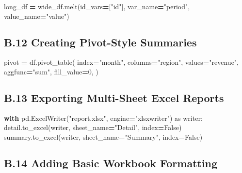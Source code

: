 \documentclass[
  12pt,
]{article}
\newenvironment{Shaded}{\begin{snugshade}}{\end{snugshade}}
\newcommand{\ControlFlowTok}[1]{\textcolor[rgb]{0.13,0.29,0.53}{\textbf{#1}}}
\newcommand{\DecValTok}[1]{\textcolor[rgb]{0.00,0.00,0.81}{#1}}
\newcommand{\ImportTok}[1]{#1}
\newcommand{\NormalTok}[1]{#1}
\newcommand{\OperatorTok}[1]{\textcolor[rgb]{0.81,0.36,0.00}{\textbf{#1}}}
\newcommand{\StringTok}[1]{\textcolor[rgb]{0.31,0.60,0.02}{#1}}
\newcommand{\VariableTok}[1]{\textcolor[rgb]{0.00,0.00,0.00}{#1}}
\begin{document}
\begin{Shaded}
\begin{Highlighting}[]
\NormalTok{long\_df }\OperatorTok{=}\NormalTok{ wide\_df.melt(id\_vars}\OperatorTok{=}\NormalTok{[}\StringTok{"id"}\NormalTok{], var\_name}\OperatorTok{=}\StringTok{"period"}\NormalTok{, value\_name}\OperatorTok{=}\StringTok{"value"}\NormalTok{)}
\end{Highlighting}
\end{Shaded}

\subsection{B.12 Creating Pivot-Style
Summaries}\label{b.12-creating-pivot-style-summaries}

\begin{Shaded}
\begin{Highlighting}[]
\NormalTok{pivot }\OperatorTok{=}\NormalTok{ df.pivot\_table(}
\NormalTok{    index}\OperatorTok{=}\StringTok{"month"}\NormalTok{,}
\NormalTok{    columns}\OperatorTok{=}\StringTok{"region"}\NormalTok{,}
\NormalTok{    values}\OperatorTok{=}\StringTok{"revenue"}\NormalTok{,}
\NormalTok{    aggfunc}\OperatorTok{=}\StringTok{"sum"}\NormalTok{,}
\NormalTok{    fill\_value}\OperatorTok{=}\DecValTok{0}\NormalTok{,}
\NormalTok{)}
\end{Highlighting}
\end{Shaded}

\subsection{B.13 Exporting Multi-Sheet Excel
Reports}\label{b.13-exporting-multi-sheet-excel-reports}

\begin{Shaded}
\begin{Highlighting}[]
\ControlFlowTok{with}\NormalTok{ pd.ExcelWriter(}\StringTok{"report.xlsx"}\NormalTok{, engine}\OperatorTok{=}\StringTok{"xlsxwriter"}\NormalTok{) }\ImportTok{as}\NormalTok{ writer:}
\NormalTok{    detail.to\_excel(writer, sheet\_name}\OperatorTok{=}\StringTok{"Detail"}\NormalTok{, index}\OperatorTok{=}\VariableTok{False}\NormalTok{)}
\NormalTok{    summary.to\_excel(writer, sheet\_name}\OperatorTok{=}\StringTok{"Summary"}\NormalTok{, index}\OperatorTok{=}\VariableTok{False}\NormalTok{)}
\end{Highlighting}
\end{Shaded}

\subsection{B.14 Adding Basic Workbook
Formatting}\label{b.14-adding-basic-workbook-formatting}
\end{document}
